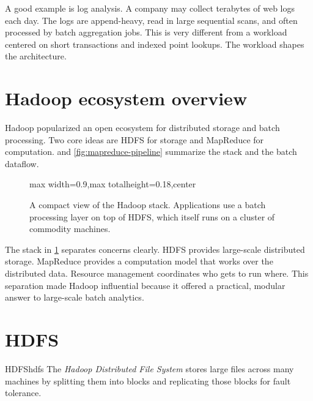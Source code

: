 \documentclass[11pt,a4paper,openany]{book}
\begin{document}
A good example is log analysis. A company may collect terabytes of web logs each day. The logs are append-heavy, read in large sequential scans, and often processed by batch aggregation jobs. This is very different from a workload centered on short transactions and indexed point lookups. The workload shapes the architecture.

\section{Hadoop ecosystem overview}
Hadoop popularized an open ecosystem for distributed storage and batch processing. Two core ideas are HDFS for storage and MapReduce for computation.  and \cref{fig:mapreduce-pipeline} summarize the stack and the batch dataflow.

\begin{figure}[tbp]
\centering
\begin{adjustbox}{max width=0.9\linewidth,max totalheight=0.18\textheight,center}
\end{adjustbox}
\caption{A compact view of the Hadoop stack. Applications use a batch processing layer on top of HDFS, which itself runs on a cluster of commodity machines.}
\label{fig:hadoop-stack}
\end{figure}

The stack in \cref{fig:hadoop-stack} separates concerns clearly. HDFS provides large-scale distributed storage. MapReduce provides a computation model that works over the distributed data. Resource management coordinates who gets to run where. This separation made Hadoop influential because it offered a practical, modular answer to large-scale batch analytics.

\section{HDFS}
\begin{definition}{HDFS}{hdfs}
The \emph{Hadoop Distributed File System} stores large files across many machines by splitting them into blocks and replicating those blocks for fault tolerance.
\end{definition}
\end{document}
